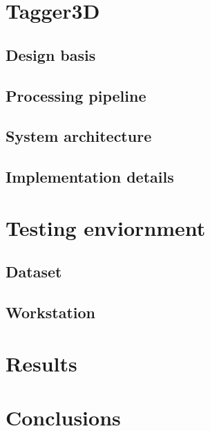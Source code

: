 \documentclass[a4paper,10pt]{article}
\begin{document}
\section{Tagger3D}

\subsection{Design basis}
\subsection{Processing pipeline}
\subsection{System architecture}
\subsection{Implementation details}

\section{Testing enviornment}

\subsection{Dataset}
\subsection{Workstation}

\section{Results}

\section{Conclusions}



\end{document}
